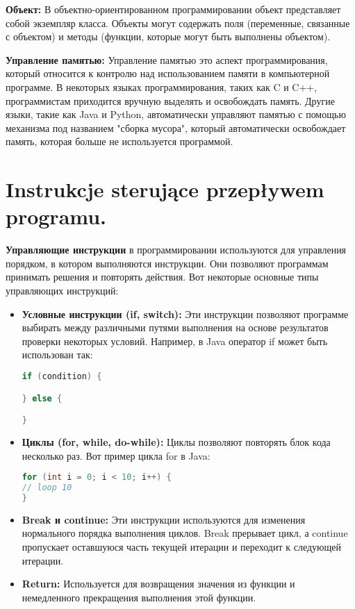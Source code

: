 \textbf{Объект:} В объектно-ориентированном программировании объект представляет собой экземпляр класса. Объекты могут содержать поля (переменные, связанные с объектом) и методы (функции, которые могут быть выполнены объектом).

\textbf{Управление памятью:} Управление памятью это аспект программирования, который относится к контролю над использованием памяти в компьютерной программе. В некоторых языках программирования, таких как C и C++, программистам приходится вручную выделять и освобождать память. Другие языки, такие как Java и Python, автоматически управляют памятью с помощью механизма под названием "сборка мусора", который автоматически освобождает память, которая больше не используется программой.

\section{Instrukcje sterujące przepływem programu. }

\textbf{Управляющие инструкции} в программировании используются для управления порядком, в котором выполняются инструкции. Они позволяют программам принимать решения и повторять действия. Вот некоторые основные типы управляющих инструкций:

\begin{itemize}
\item \textbf{Условные инструкции (if, switch):} Эти инструкции позволяют программе выбирать между различными путями выполнения на основе результатов проверки некоторых условий. Например, в Java оператор if может быть использован так:

\begin{lstlisting}[language=Java]
if (condition) {

} else {

}
\end{lstlisting}

\item \textbf{Циклы (for, while, do-while):} Циклы позволяют повторять блок кода несколько раз. Вот пример цикла for в Java:

\begin{lstlisting}[language=Java]
for (int i = 0; i < 10; i++) {
// loop 10
}
\end{lstlisting}

\item \textbf{Break и continue:} Эти инструкции используются для изменения нормального порядка выполнения циклов. Break прерывает цикл, а continue пропускает оставшуюся часть текущей итерации и переходит к следующей итерации.

\item \textbf{Return:} Используется для возвращения значения из функции и немедленного прекращения выполнения этой функции.
\end{itemize}

